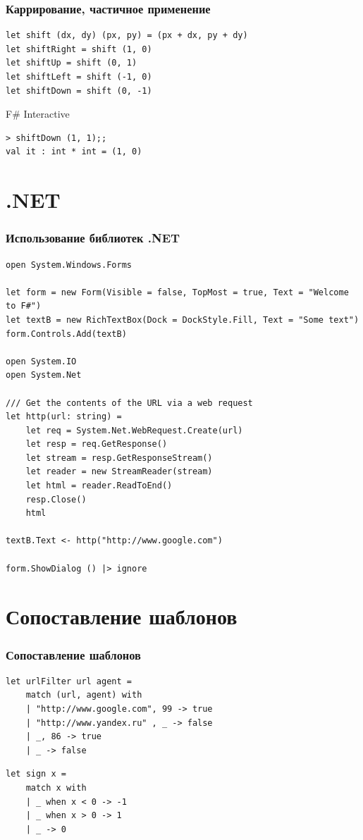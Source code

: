 \documentclass[xetex,mathserif,serif]{beamer}
\begin{document}
	\begin{frame}[fragile]
		\frametitle{Каррирование, частичное применение}
		\begin{verbatim}
let shift (dx, dy) (px, py) = (px + dx, py + dy)
let shiftRight = shift (1, 0)
let shiftUp = shift (0, 1)
let shiftLeft = shift (-1, 0)
let shiftDown = shift (0, -1)
		\end{verbatim}
		\begin{alertblock}{F\# Interactive}
			\begin{verbatim}
> shiftDown (1, 1);;
val it : int * int = (1, 0)
			\end{verbatim}
		\end{alertblock}
	\end{frame}

	\section{.NET}

	\begin{frame}[fragile]
		\frametitle{Использование библиотек .NET}
		\begin{scriptsize}
			\begin{verbatim}
open System.Windows.Forms

let form = new Form(Visible = false, TopMost = true, Text = "Welcome to F#")
let textB = new RichTextBox(Dock = DockStyle.Fill, Text = "Some text")
form.Controls.Add(textB)

open System.IO
open System.Net

/// Get the contents of the URL via a web request
let http(url: string) =
    let req = System.Net.WebRequest.Create(url)
    let resp = req.GetResponse()
    let stream = resp.GetResponseStream()
    let reader = new StreamReader(stream)
    let html = reader.ReadToEnd()
    resp.Close()
    html

textB.Text <- http("http://www.google.com")

form.ShowDialog () |> ignore
			\end{verbatim}
		\end{scriptsize}
	\end{frame}

	\section{Сопоставление шаблонов}
	
	\begin{frame}[fragile]
		\frametitle{Сопоставление шаблонов}
		\begin{verbatim}
let urlFilter url agent =
    match (url, agent) with
    | "http://www.google.com", 99 -> true
    | "http://www.yandex.ru" , _ -> false
    | _, 86 -> true
    | _ -> false
		\end{verbatim}

		\begin{verbatim}
let sign x =
    match x with
    | _ when x < 0 -> -1
    | _ when x > 0 -> 1
    | _ -> 0
		\end{verbatim}
	\end{frame}
\end{document}
